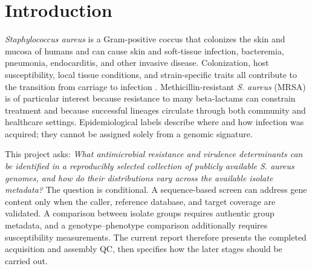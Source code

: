 \documentclass[11pt,a4paper]{article}
\begin{document}
\begin{abstract}
\noindent\textbf{Background.} Genome sequencing can identify known resistance and virulence determinants in \textit{Staphylococcus aureus}, provided that assemblies, reference databases, and isolate metadata are adequately documented. \textbf{Objective.} This study establishes a reproducible workflow for a small collection of public reference assemblies and evaluates the assembly data available before molecular screening. \textbf{Methods.} Four distinct, versioned NCBI RefSeq assemblies were selected as a technical demonstration cohort. Downloaded FASTA files were checked for valid sequence identifiers, non-empty records, and valid characters; assembly length, GC content, N50, sequence-record count, and ambiguous-base fraction were calculated. A predefined exploratory screen was applied. \textbf{Results.} All four files passed this screen. Assembly lengths ranged from 2,820,462 to 2,917,469 bp; sequence-record counts ranged from one to four. Four automated tests and six notebooks executed successfully. \textbf{Interpretation.} These are assembly-level observations, not evidence of completeness, antimicrobial susceptibility, toxin expression, or clinical phenotype. AMRFinderPlus, MLST, and SCCmec analyses were not performed in the present environment. The cohort cannot support population prevalence or acquisition-setting comparisons.
\end{abstract}

\section{Introduction}
\textit{Staphylococcus aureus} is a Gram-positive coccus that colonizes the skin and mucosa of humans and can cause skin and soft-tissue infection, bacteremia, pneumonia, endocarditis, and other invasive disease. Colonization, host susceptibility, local tissue conditions, and strain-specific traits all contribute to the transition from carriage to infection \cite{Tong2015,Foster2004}. Methicillin-resistant \textit{S. aureus} (MRSA) is of particular interest because resistance to many beta-lactams can constrain treatment and because successful lineages circulate through both community and healthcare settings. Epidemiological labels describe where and how infection was acquired; they cannot be assigned solely from a genomic signature.

This project asks: \emph{What antimicrobial resistance and virulence determinants can be identified in a reproducibly selected collection of publicly available \textit{S. aureus} genomes, and how do their distributions vary across the available isolate metadata?} The question is conditional. A sequence-based screen can address gene content only when the caller, reference database, and target coverage are validated. A comparison between isolate groups requires authentic group metadata, and a genotype--phenotype comparison additionally requires susceptibility measurements. The current report therefore presents the completed acquisition and assembly QC, then specifies how the later stages should be carried out.
\end{document}
